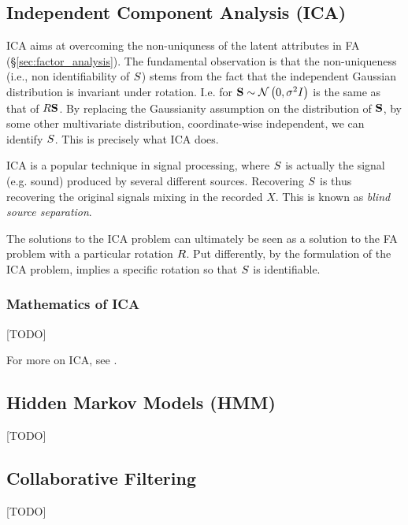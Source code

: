 \subsection{Independent Component Analysis (ICA)}
ICA aims at overcoming the non-uniquness of the latent attributes in FA (\S\ref{sec:factor_analysis}).
The fundamental observation is that the non-uniqueness (i.e., non identifiability of $S$) stems from the fact that the independent Gaussian distribution is invariant under rotation. I.e. for $\mathbf{S} \sim \mathcal{N}\left(0,\sigma^2 I\right)$ is the same as that of $R \mathbf{S}$. 
By replacing the Gaussianity assumption on the distribution of $\mathbf{S}$, by some other multivariate distribution, coordinate-wise independent, we can identify $S$. 
This is precisely what ICA does. 

\begin{remark}
ICA is a popular technique in signal processing, where $S$ is actually the signal (e.g. sound) produced by several different sources. Recovering $S$ is thus recovering the original signals mixing in the recorded $X$. This is known as \emph{blind source separation}.
\end{remark}

\begin{remark}
The solutions to the ICA problem can ultimately be seen as a solution to the FA problem with a particular rotation $R$.
Put differently, by the formulation of the ICA problem, implies a specific rotation so that $S$ is identifiable. 
\end{remark}



\subsubsection{Mathematics of ICA}
[TODO]


For more on ICA, see \cite{hyvarinen_independent_2000}. 







\subsection{Hidden Markov Models (HMM)}
\label{sec:hmm}
[TODO]




\subsection{Collaborative Filtering}
\label{sec:collaborative_filtering}
[TODO]



